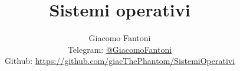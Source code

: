 

\title{\Huge \textbf{Sistemi operativi}}

\author{
  Giacomo Fantoni \\
  \small Telegram: \href{https://t.me/GiacomoFantoni}{@GiacomoFantoni} \\[3pt]
  \small Github: \href{https://github.com/giacThePhantom/SistemiOperativi}{https://github.com/giacThePhantom/SistemiOperativi}}

\maketitle
\tableofcontents




